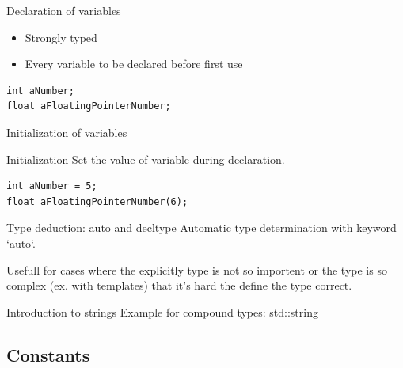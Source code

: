 \documentclass{beamer}
\begin{document}
\begin{frame}[fragile]{Declaration of variables}
\begin{itemize}
  \item Strongly typed
  \item Every variable to be declared before first use
\end{itemize}
\begin{lstlisting}[caption=Variable declaration]
int aNumber;
float aFloatingPointerNumber;
\end{lstlisting}
\end{frame}

\begin{frame}[fragile]{Initialization of variables}
\begin{definition}{Initialization}
   Set the value of variable during declaration. 
\end{definition}
\begin{lstlisting}[caption=Variable initialization]
int aNumber = 5;
float aFloatingPointerNumber(6);
\end{lstlisting}
\end{frame}

\begin{frame}[fragile]{Type deduction: auto and decltype}
Automatic type determination with keyword `auto`.

Usefull for cases where the explicitly type is not so importent or the type is
so complex (ex. with templates) that it's hard the define the type correct.



\end{frame}

\begin{frame}{Introduction to strings}
Example for compound types: std::string



\end{frame}


\subsection{Constants}
\end{document}

